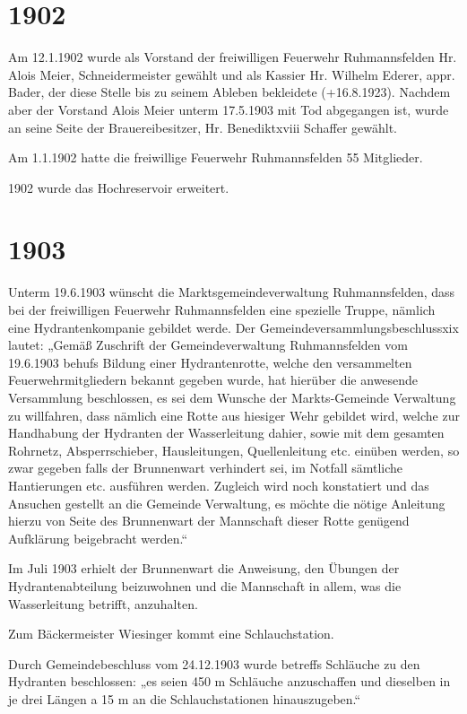\documentclass[12pt,a4paper]{book}
\begin{document}
\section*{1902}

Am 12.1.1902 wurde als Vorstand der freiwilligen Feuerwehr Ruhmannsfelden Hr.
Alois Meier, Schneidermeister gewählt und als Kassier Hr. Wilhelm Ederer, appr.
Bader, der diese Stelle bis zu seinem Ableben bekleidete (+16.8.1923). Nachdem
aber der Vorstand Alois Meier unterm 17.5.1903 mit Tod abgegangen ist, wurde an
seine Seite der Brauereibesitzer, Hr. Benediktxviii Schaffer gewählt.

Am 1.1.1902 hatte die freiwillige Feuerwehr Ruhmannsfelden 55 Mitglieder.

1902 wurde das Hochreservoir erweitert.

\section*{1903}

Unterm 19.6.1903 wünscht die Marktsgemeindeverwaltung Ruhmannsfelden, dass bei
der freiwilligen Feuerwehr Ruhmannsfelden eine spezielle Truppe, nämlich eine
Hydrantenkompanie gebildet werde. Der Gemeindeversammlungsbeschlussxix lautet:
„Gemäß Zuschrift der Gemeindeverwaltung Ruhmannsfelden vom 19.6.1903 behufs
Bildung einer Hydrantenrotte, welche den versammelten Feuerwehrmitgliedern
bekannt gegeben wurde, hat hierüber die anwesende Versammlung beschlossen, es
sei dem Wunsche der Markts-Gemeinde Verwaltung zu willfahren, dass nämlich eine
Rotte aus hiesiger Wehr gebildet wird, welche zur Handhabung der Hydranten der
Wasserleitung dahier, sowie mit dem gesamten Rohrnetz, Absperrschieber,
Hausleitungen, Quellenleitung etc. einüben werden, so zwar gegeben falls der
Brunnenwart verhindert sei, im Notfall sämtliche Hantierungen etc. ausführen
werden. Zugleich wird noch konstatiert und das Ansuchen gestellt an die Gemeinde
Verwaltung, es möchte die nötige Anleitung hierzu von Seite des Brunnenwart der
Mannschaft dieser Rotte genügend Aufklärung beigebracht werden.“

Im Juli 1903 erhielt der Brunnenwart die Anweisung, den Übungen der
Hydrantenabteilung beizuwohnen und die Mannschaft in allem, was die
Wasserleitung betrifft, anzuhalten.

Zum Bäckermeister Wiesinger kommt eine Schlauchstation.

Durch Gemeindebeschluss vom 24.12.1903 wurde betreffs Schläuche zu den Hydranten
beschlossen: „es seien 450 m Schläuche anzuschaffen und dieselben in je drei
Längen a 15 m an die Schlauchstationen hinauszugeben.“
\end{document}
